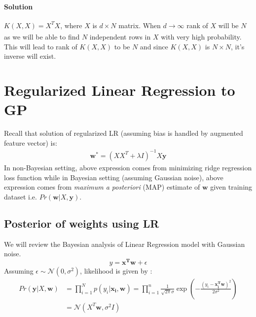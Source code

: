 \documentclass[12pt]{article}
\begin{document}
\paragraph{Solution} $K(X,X) = X^TX$, where $X$ is $d \times N$ matrix. When $d \xrightarrow[]{} \infty$ rank of $X$ will be $N$ as we will be able to find $N$ independent rows in $X$ with very high probability. This will lead to rank of $K(X,X)$ to be $N$ and since $K(X,X)$ is $N \times N$, it's inverse will exist.

\section{Regularized Linear Regression to GP}

Recall that solution of regularized LR (assuming bias is handled by augmented feature vector) is:
\begin{align}
    \mathbf{w^*} = (XX^T+ \lambda I )^{-1}X \mathbf{y}
\end{align}
In non-Bayesian setting, above expression comes from minimizing ridge regression loss function while in Bayesian setting (assuming Gaussian noise), above expression comes from \textit{maximum a posteriori} (MAP) estimate of $\mathbf{w}$ given training dataset i.e. $Pr(\mathbf{w} | X, \mathbf{y})$.

\subsection{Posterior of weights using LR}
We will review the Bayesian analysis of Linear Regression model with Gaussian noise.
$$y = \mathbf{x^Tw} + \epsilon $$
Assuming $\epsilon \sim \mathcal{N}(0,\sigma^{2})$, likelihood is given by :
\begin{align}
    Pr(\textbf{y}|X,\textbf{w}) &= \prod_{i=1}^{N} p(y_i|\mathbf{x_i,w}) = \prod_{i=1}^{n} {\frac{1}{\sqrt{2\pi}\sigma} \exp(-\frac{(y_i - \mathbf{x_i^Tw})^2}{2\sigma^2})} \nonumber \\
    &= \mathcal{N}(X^T\mathbf{w}, \sigma^2 I)
\end{align}
\end{document}

